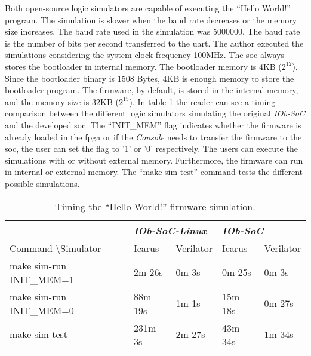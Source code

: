 Both open-source logic simulators are capable of executing the \enquote{Hello World!} program. The simulation is slower when the baud rate decreases or the memory size increases. The baud rate used in the simulation was 5000000. The baud rate is the number of bits per second transferred to the \acrshort{uart}. The author executed the simulations considering the system clock frequency 100MHz. The \acrshort{soc} always stores the bootloader in internal memory. The bootloader memory is 4KB ($2^12$). Since the bootloader binary is 1508 Bytes, 4KB is enough memory to store the bootloader program. The firmware, by default, is stored in the internal memory, and the memory size is 32KB ($2^15$). In table \ref{tab:hello_sim} the reader can see a timing comparison between the different logic simulators simulating the original \textit{IOb-SoC} and the developed \acrshort{soc}. The \enquote{INIT\_MEM} flag indicates whether the firmware is already loaded in the \acrshort{fpga} or if the \textit{Console} needs to transfer the firmware to the \acrshort{soc}, the user can set the flag to '1' or '0' respectively. The users can execute the simulations with or without external memory. Furthermore, the firmware can run in internal or external memory. The \enquote{make sim-test} command tests the different possible simulations.

\begin{table}[!ht]
    \centering
    \begin{tabular}{l|ll|ll|}
    \cline{2-5}
                                                           & \multicolumn{2}{l|}{\textit{IOb-SoC-Linux}} & \multicolumn{2}{l|}{\textit{IOb-SoC}}    \\ \hline
    \multicolumn{1}{|l|}{Command \textbackslash Simulator} & \multicolumn{1}{l|}{Icarus}  & Verilator & \multicolumn{1}{l|}{Icarus}  & Verilator \\ \hline
    \multicolumn{1}{|l|}{make sim-run INIT\_MEM=1}              & \multicolumn{1}{l|}{2m 26s}  & 0m 3s     & \multicolumn{1}{l|}{0m 25s}  & 0m 3s     \\ \hline
    \multicolumn{1}{|l|}{make sim-run INIT\_MEM=0}              & \multicolumn{1}{l|}{88m 19s} & 1m 1s     & \multicolumn{1}{l|}{15m 18s} & 0m 27s    \\ \hline
    \multicolumn{1}{|l|}{make sim-test}                         & \multicolumn{1}{l|}{231m 3s} & 2m 27s    & \multicolumn{1}{l|}{43m 34s} & 1m 34s    \\ \hline
    \end{tabular}
    \caption{Timing the \enquote{Hello World!} firmware simulation.}
    \label{tab:hello_sim}
\end{table}

